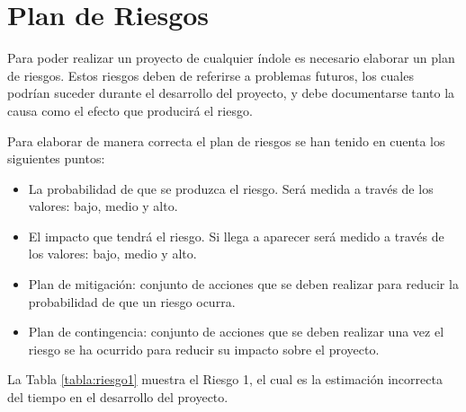 \section{Plan de Riesgos}

Para poder realizar un proyecto de cualquier índole es necesario elaborar un plan de riesgos. Estos riesgos deben de referirse a problemas futuros, los cuales podrían suceder durante el desarrollo del proyecto, y debe documentarse tanto la causa como el efecto que producirá el riesgo.


Para elaborar de manera correcta el plan de riesgos se han tenido en cuenta los siguientes puntos:

\begin{itemize}
    \item La probabilidad de que se produzca el riesgo. Será medida a través de los valores: bajo, medio y alto.
    \item El impacto que tendrá el riesgo. Si llega a aparecer será medido a través de los valores: bajo, medio y alto.
    \item Plan de mitigación: conjunto de acciones que se deben realizar para reducir la probabilidad de que un riesgo ocurra.
    \item Plan de contingencia: conjunto de acciones que se deben realizar una vez el riesgo se ha ocurrido para reducir su impacto sobre el proyecto.
\end{itemize}

La Tabla \ref{tabla:riesgo1} muestra el Riesgo 1, el cual es la estimación incorrecta del tiempo en el desarrollo del proyecto.

